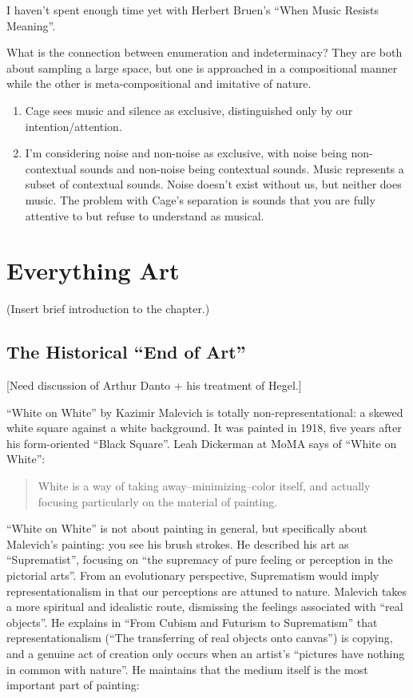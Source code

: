 \documentclass{thesis}
\begin{document}
	I haven't spent enough time yet with Herbert Bruen's ``When Music Resists Meaning''.\cite{Bruen04}
	
	What is the connection between enumeration and indeterminacy? They are both about sampling a large space, but one is approached in a compositional manner while the other is meta-compositional and imitative of nature.
	
\begin{enumerate}
	\item Cage sees music and silence as exclusive, distinguished only by our intention/attention.
	\item I'm considering noise and non-noise as exclusive, with noise being non-contextual sounds and non-noise being contextual sounds. Music represents a subset of contextual sounds. Noise doesn't exist without us, but neither does music. The problem with Cage's separation is sounds that you are fully attentive to but refuse to understand as musical.
\end{enumerate}
	
\chapter{Everything Art}	
(Insert brief introduction to the chapter.)

\section{The Historical ``End of Art''}	
	[Need discussion of Arthur Danto + his treatment of Hegel.]

	``White on White'' by Kazimir Malevich is totally non-representational: a skewed white square against a white background. It was painted in 1918, five years after his form-oriented ``Black Square''. Leah Dickerman at MoMA says of ``White on White''\cite{moma_kazimir_2006}:
	
	\begin{quote}
	White is a way of taking away--minimizing--color itself, and actually focusing particularly on the material of painting.
	\end{quote}
	
	``White on White'' is not about painting in general, but specifically about Malevich's painting: you see his brush strokes. He described his art as ``Suprematist'', focusing on ``the supremacy of pure feeling or perception in the pictorial arts''. From an evolutionary perspective, Suprematism would imply representationalism in that our perceptions are attuned to nature. Malevich takes a more spiritual and idealistic route, dismissing the feelings associated with ``real objects''. He explains in ``From Cubism and Futurism to Suprematism'' that representationalism (``The transferring of real objects onto canvas'') is copying, and a genuine act of creation only occurs when an artist's ``pictures have nothing in common with nature''. He maintains that the medium itself is the most important part of painting:
	
\end{document}
